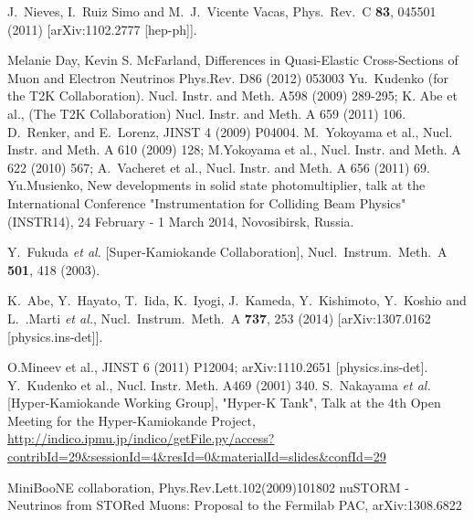 \documentclass[%
reprint,
superscriptaddress,
 amsmath,amssymb,
 aps,
floatfix,
]{revtex4-1}
\begin{document}
\begin{thebibliography}{99}
  J.~Nieves, I.~Ruiz Simo and M.~J.~Vicente Vacas,
  Phys.\ Rev.\ C {\bf 83}, 045501 (2011)
  [arXiv:1102.2777 [hep-ph]].




Melanie Day, Kevin S. McFarland, Differences in Quasi-Elastic Cross-Sections of Muon and Electron Neutrinos Phys.Rev. D86 (2012) 053003 
Yu.~Kudenko (for the T2K Collaboration). Nucl. Instr. and Meth. A598 (2009) 289-295; 
K. Abe et al., (The T2K Collaboration) Nucl. Instr. and Meth. A 659 (2011) 106.
D.~Renker, and E.~Lorenz, JINST 4 (2009) P04004.
 M.~Yokoyama  et al., Nucl. Instr. and Meth. A 610 (2009) 128; 
M.Yokoyama et al., Nucl. Instr. and Meth. A 622 (2010) 567;
A.~Vacheret et al., Nucl. Instr. and Meth. A 656 (2011) 69.
 Yu.Musienko, New developments in solid state photomultiplier, talk at the International Conference "Instrumentation for Colliding Beam Physics" (INSTR14), 24 February - 1 March 2014, Novosibirsk, Russia.

  Y.~Fukuda {\it et al.}  [Super-Kamiokande Collaboration],
  Nucl.\ Instrum.\ Meth.\ A {\bf 501}, 418 (2003).

  K.~Abe, Y.~Hayato, T.~Iida, K.~Iyogi, J.~Kameda, Y.~Kishimoto, Y.~Koshio and L.~.Marti {\it et al.},
  Nucl.\ Instrum.\ Meth.\ A {\bf 737}, 253 (2014)
  [arXiv:1307.0162 [physics.ins-det]].


O.Mineev et al., JINST 6 (2011) P12004; arXiv:1110.2651 [physics.ins-det].
Y.~Kudenko et al., Nucl. Instr.  Meth. A469 (2001) 340.
S.~Nakayama {\it et al.} [Hyper-Kamiokande Working Group],
"Hyper-K Tank",
Talk at the 4th Open Meeting for the Hyper-Kamiokande Project,
\url{http://indico.ipmu.jp/indico/getFile.py/access?contribId=29&sessionId=4&resId=0&materialId=slides&confId=29}

 MiniBooNE collaboration, Phys.Rev.Lett.102(2009)101802 
nuSTORM - Neutrinos from STORed Muons: Proposal to the Fermilab PAC, arXiv:1308.6822



\end{thebibliography}
\end{document}
